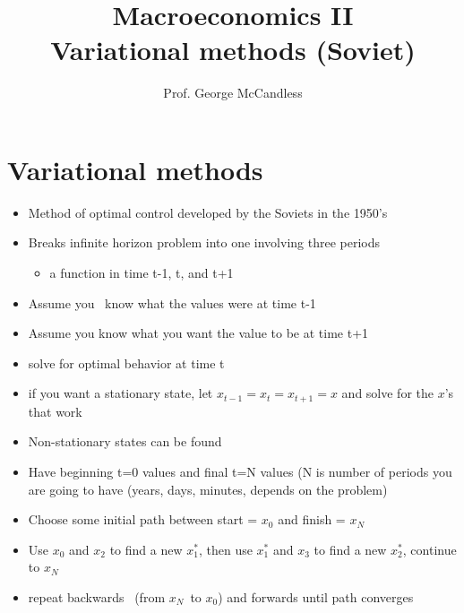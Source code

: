 \documentclass[notes=show]{beamer}
\begin{document}
\title{Macroeconomics II\\
Variational methods (Soviet)}
\author{Prof. George McCandless}
\maketitle

\section{Variational methods}

\begin{frame}%


\begin{itemize}
\item Method of optimal control developed by the Soviets in the 1950's

\item Breaks infinite horizon problem into one involving three periods

\begin{itemize}
\item a function in time t-1, t, and t+1
\end{itemize}

\item Assume you \ know what the values were at time t-1

\item Assume you know what you want the value to be at time t+1

\item solve for optimal behavior at time t

\item if you want a stationary state, let $x_{t-1}=x_{t}=x_{t+1}=x$ and
solve for the $x$'s that work

\item Non-stationary states can be found

\item Have beginning t=0 values and final t=N values (N is number of periods
you are going to have (years, days, minutes, depends on the problem)

\item Choose some initial path between start = $x_{0}$ and finish = $x_{N}$

\item Use $x_{0}$ and $x_{2}$ to find a new $x_{1}^{\ast }$, then use $%
x_{1}^{\ast }$ and $x_{3}$ to find a new $x_{2}^{\ast }$, continue to $x_{N}$

\item repeat backwards \ (from $x_{N}$\ to $x_{0}$) and forwards until path
converges
\end{itemize}

\end{frame}%
\end{document}
